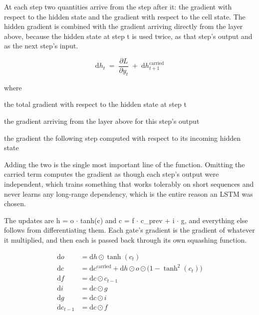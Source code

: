 At each step two quantities arrive from the step after it: the gradient with respect to the hidden state and the gradient with respect to the cell state. The hidden gradient is combined with the gradient arriving directly from the layer above, because the hidden state at step t is used twice, as that step's output and as the next step's input.


\begin{equation}
\mathrm{d}h_t \;=\; \frac{\partial L}{\partial y_t} \;+\; \mathrm{d}h_{t+1}^{\mathrm{carried}}
\end{equation}

\noindent where
\begin{description}[leftmargin=2.4em,style=nextline,font=\normalfont\ttfamily]\setlength\itemsep{1pt}
  \item[{$\mathrm{d}h_t$}] \normalfont the total gradient with respect to the hidden state at step t
  \item[{$\frac{\partial L}{\partial y_t}$}] \normalfont the gradient arriving from the layer above for this step's output
  \item[{$\mathrm{d}h_{t+1}^{\mathrm{carried}}$}] \normalfont the gradient the following step computed with respect to its incoming hidden state
\end{description}
Adding the two is the single most important line of the function. Omitting the carried term computes the gradient as though each step's output were independent, which trains something that works tolerably on short sequences and never learns any long-range dependency, which is the entire reason an LSTM was chosen.


The updates are h = o $\cdot$ tanh(c) and c = f $\cdot$ c\_prev + i $\cdot$ g, and everything else follows from differentiating them. Each gate's gradient is the gradient of whatever it multiplied, and then each is passed back through its own squashing function.


\begin{equation}
\begin{aligned} \mathrm{d}o &= \mathrm{d}h \odot \tanh(c_t) \\[2pt] \mathrm{d}c &= \mathrm{d}c^{\mathrm{carried}} + \mathrm{d}h \odot o \odot \big(1 - \tanh^2(c_t)\big) \\[2pt] \mathrm{d}f &= \mathrm{d}c \odot c_{t-1} \\[2pt] \mathrm{d}i &= \mathrm{d}c \odot g \\[2pt] \mathrm{d}g &= \mathrm{d}c \odot i \\[2pt] \mathrm{d}c_{t-1} &= \mathrm{d}c \odot f \end{aligned}
\end{equation}


